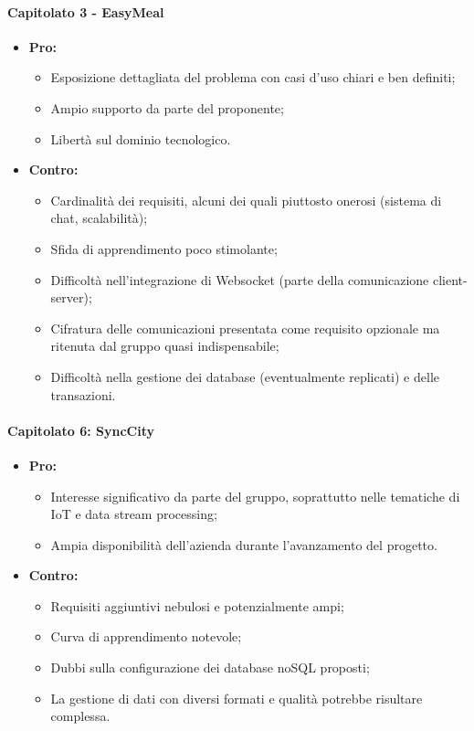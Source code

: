 \paragraph{Capitolato 3 - EasyMeal}
\begin{itemize}
	\item \textbf{Pro:}
	\begin{itemize}
		\item Esposizione dettagliata del problema con casi d'uso chiari e ben definiti;
		\item Ampio supporto da parte del proponente;
		\item Libertà sul dominio tecnologico.
	\end{itemize}
	\item \textbf{Contro:}
	\begin{itemize}
		\item Cardinalità dei requisiti, alcuni dei quali piuttosto onerosi (sistema di chat, scalabilità);
		\item Sfida di apprendimento poco stimolante;
		\item Difficoltà nell'integrazione di Websocket (parte della comunicazione client-server);
		\item Cifratura delle comunicazioni presentata come requisito opzionale ma ritenuta dal gruppo quasi indispensabile;
		\item Difficoltà nella gestione dei database (eventualmente replicati) e delle transazioni.
	\end{itemize}
\end{itemize}

\paragraph{Capitolato 6: SyncCity}
\begin{itemize}
	\item \textbf{Pro:}
	\begin{itemize}
		\item Interesse significativo da parte del gruppo, soprattutto nelle tematiche di IoT e data stream processing;
		\item Ampia disponibilità dell'azienda durante l’avanzamento del progetto.
	\end{itemize}
	\item \textbf{Contro:}
	\begin{itemize}
		\item Requisiti aggiuntivi nebulosi e potenzialmente ampi;
		\item Curva di apprendimento notevole;
		\item Dubbi sulla configurazione dei database noSQL proposti;
		\item La gestione di dati con diversi formati e qualità potrebbe risultare complessa.
	\end{itemize}
\end{itemize}

